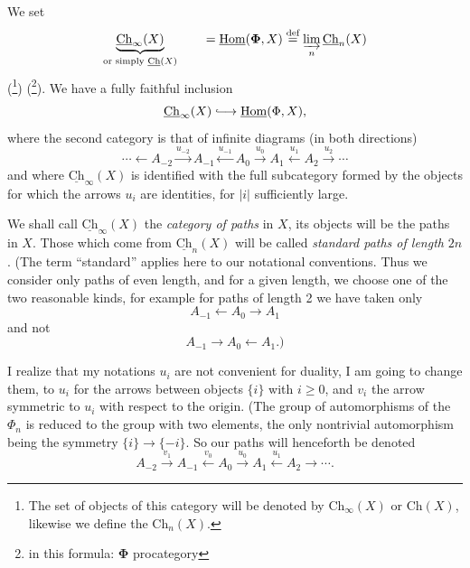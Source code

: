 \documentclass[11pt]{article}
\newcommand{\msp}[1]{\marginpar{\footnotesize [#1]}}
\newcommand{\uCh}{\underline{\mathrm{Ch}}}
\newcommand{\uHom}{\underline{\mathrm{Hom}}}
\newcommand{\bPhi}{\boldsymbol{\Phi}}
\begin{document}
\msp{page 3}
We set
\[
\underbrace{\uCh_\infty(X)}_{\text{or simply }\uCh(X)}\qquad=\uHom(\bPhi,X)\overset{\text{def}}{=}\varinjlim_n\uCh_n(X)
\]
(\footnote{The set of objects of this category will be denoted by $\mathrm{Ch}_\infty(X)$ or $\mathrm{Ch}(X)$, likewise we define the $\mathrm{Ch}_n(X)$.}) (\footnote{in this formula: $\bPhi$ procategory}). We have a fully faithful inclusion
\[
\uCh_\infty(X)\lhook\joinrel\longrightarrow\uHom(\Phi,X),
\]
where the second category is that of infinite diagrams (in both directions)
\[
\cdots\longleftarrow A_{-2}\xrightarrow{u_{-2}}A_{-1}\xleftarrow{u_{-1}}A_0\xrightarrow{u_0}A_1\xleftarrow{u_1}A_2\xrightarrow{u_2}\cdots
\]
and where $\uCh_\infty(X)$ is identified with the full subcategory formed by the objects for which the arrows $u_i$ are identities, for $|i|$ sufficiently large. %

We shall call $\uCh_\infty(X)$ the \textit{category of paths} in $X$, its objects will be the paths in $X$. Those which come from $\uCh_n(X)$ will be called \textit{standard paths of length} $2n$. (The term ``standard'' applies here to our notational conventions. Thus we consider only paths of even length, and for a given length, we choose one of the two reasonable kinds, for example for paths of length 2 we have taken only
\[
A_{-1}\longleftarrow A_0\longrightarrow A_1
\]
and not
\[
A_{-1}\longrightarrow A_0\longleftarrow A_1.)
\]

\msp{page 4}
I realize that my notations $u_i$ are not convenient for duality, I am going to change them, to $u_i$ for the arrows between objects $\{i\}$ with $i\ge0$, and $v_i$ the arrow symmetric to $u_i$ with respect to the origin. (The group of automorphisms of the $\Phi_n$ is reduced to the group with two elements, the only nontrivial automorphism being the symmetry $\{i\}\longrightarrow\{-i\}$. So our paths will henceforth be denoted %
\[
A_{-2}\xrightarrow{v_1}A_{-1}\xleftarrow{v_0}A_0\xrightarrow{u_0}A_1\xleftarrow{u_1}A_2\longrightarrow\cdots.
\tag*{$(*)$}
\]
\end{document}
